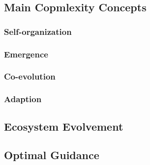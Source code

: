 
\subsection{Main Copmlexity Concepts} %
\label{sub:main_copmlexity_concepts}

\subsubsection{Self-organization}

\subsubsection{Emergence}

\subsubsection{Co-evolution}

\subsubsection{Adaption}

\subsection{Ecosystem Evolvement} %
\label{sub:ecosystem_evolvement}


\subsection{Optimal Guidance} %
\label{sub:optimal_guidance}

